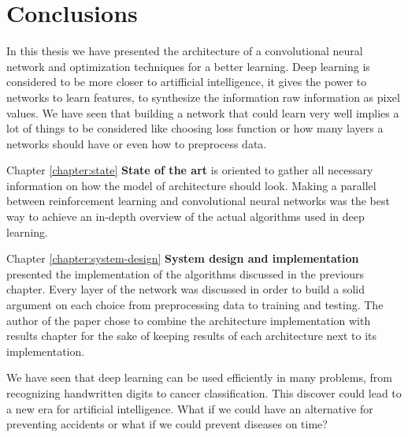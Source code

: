 \chapter{Conclusions}
\label{chapter:conclusions}

In this thesis we have presented the architecture of a convolutional neural network and optimization techniques for a better learning. Deep learning is considered to be more closer to artifficial intelligence, it gives the power to networks to learn features, to synthesize the information raw information as pixel values. We have seen that building a network that could learn very well implies a lot of things to be considered like choosing loss function or how many layers a networks should have or even how to preprocess data.

Chapter \ref{chapter:state} \textbf{State of the art} is oriented to gather all necessary information on how the model of architecture should look. Making a parallel between reinforcement learning and convolutional neural networks was the best way to achieve an in-depth overview of the actual algorithms used in deep learning.

Chapter \ref{chapter:system-design} \textbf{System design and implementation} presented the implementation of the algorithms discussed in the previours chapter. Every layer of the network was discussed in order to build a solid argument on each choice from preprocessing data to training and testing. The author of the paper chose to combine the architecture implementation with results chapter for the sake of keeping results of each architecture next to its implementation.

We have seen that deep learning can be used efficiently in many problems, from recognizing handwritten digits to cancer classification. This discover could lead to a new era for artificial intelligence. What if we could have an alternative for preventing accidents or what if we could prevent diseases on time?
